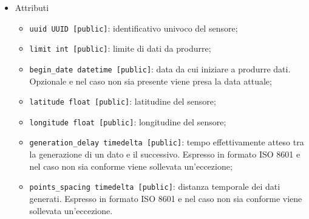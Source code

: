 \begin{itemize}
    \begin{itemize}
        \item Attributi
        \begin{itemize}
            \item \texttt{uuid UUID [public]}: identificativo univoco del sensore;
            \item \texttt{limit int [public]}: limite di dati da produrre;
            \item \texttt{begin\_date datetime [public]}: data da cui iniziare a produrre dati. Opzionale e nel caso non sia presente viene presa la data attuale;
            \item \texttt{latitude float [public]}: latitudine del sensore;
            \item \texttt{longitude float [public]}: longitudine del sensore;
            \item \texttt{generation\_delay timedelta [public]}: tempo effettivamente atteso tra la generazione di un dato e il successivo. Espresso in formato ISO 8601 e nel caso non sia conforme viene sollevata un'eccezione; 
            \item \texttt{points\_spacing timedelta [public]}: distanza temporale dei dati generati. Espresso in formato ISO 8601 e nel caso non sia conforme viene sollevata un'eccezione.
        \end{itemize}
    \end{itemize}
\end{itemize}
